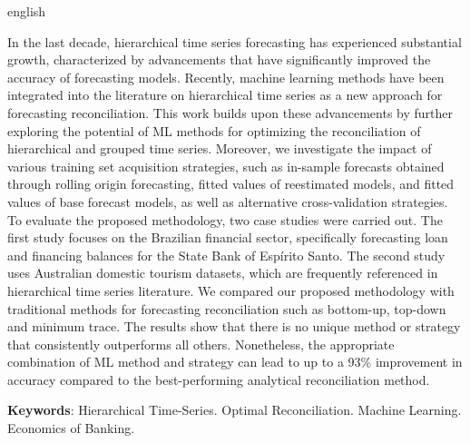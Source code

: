 \begin{resumo}[Abstract]
  \begin{otherlanguage*}{english}
    
    In the last decade, hierarchical time series forecasting has experienced substantial growth, characterized by advancements that have significantly improved the accuracy of forecasting models. Recently, machine learning methods have been integrated into the literature on hierarchical time series as a new approach for forecasting reconciliation. This work builds upon these advancements by further exploring the potential of ML methods for optimizing the reconciliation of hierarchical and grouped time series. Moreover, we investigate the impact of various training set acquisition strategies, such as in-sample forecasts obtained through rolling origin forecasting, fitted values of reestimated models, and fitted values of base forecast models, as well as alternative cross-validation strategies. To evaluate the proposed methodology, two case studies were carried out. The first study focuses on the Brazilian financial sector, specifically forecasting loan and financing balances for the State Bank of Espírito Santo. The second study uses Australian domestic tourism datasets, which are frequently referenced in hierarchical time series literature. We compared our proposed methodology with traditional methods for forecasting reconciliation such as bottom-up, top-down and minimum trace. The results show that there is no unique method or strategy that consistently outperforms all others. Nonetheless, the appropriate combination of ML method and strategy can lead to up to a 93\% improvement in accuracy compared to the best-performing analytical reconciliation method.
    \vspace{\onelineskip}
 
    \noindent 
    \textbf{Keywords}: Hierarchical Time-Series. Optimal Reconciliation. Machine Learning. Economics of Banking.
  \end{otherlanguage*}
\end{resumo}

\listoffigures*
\cleardoublepage


\listoftables*
\cleardoublepage

